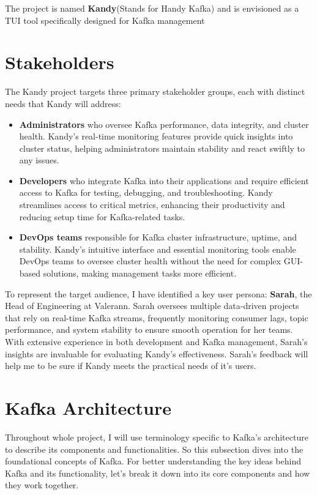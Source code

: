 \documentclass[10pt , a4paper]{report}
\begin{document}
The project is named \textbf{Kandy}(Stands for Handy Kafka) and is envisioned as a TUI tool specifically designed for Kafka management

\section{Stakeholders} 
The Kandy project targets three primary stakeholder groups, each with distinct needs that Kandy will address:

\begin{itemize} 
    \item \textbf{Administrators} who oversee Kafka performance, data integrity, and cluster health. Kandy’s real-time monitoring features provide quick insights into cluster status, helping administrators maintain stability and react swiftly to any issues.
    \item \textbf{Developers} who integrate Kafka into their applications and require efficient access to Kafka for testing, debugging, and troubleshooting. Kandy streamlines access to critical metrics, enhancing their productivity and reducing setup time for Kafka-related tasks.
    \item \textbf{DevOps teams} responsible for Kafka cluster infrastructure, uptime, and stability. Kandy’s intuitive interface and essential monitoring tools enable DevOps teams to oversee cluster health without the need for complex GUI-based solutions, making management tasks more efficient.
\end{itemize}

To represent the target audience, I have identified a key user persona: \textbf{Sarah}, the Head of Engineering at Valerann. Sarah oversees multiple data-driven projects that rely on real-time Kafka streams, frequently monitoring consumer lags, topic performance, and system stability to ensure smooth operation for her teams. With extensive experience in both development and Kafka management, Sarah’s insights are invaluable for evaluating Kandy’s effectiveness. Sarah’s feedback will help me to be sure if Kandy meets the practical needs of it's users.

\newpage

\section{Kafka Architecture}

Throughout whole project, I will use terminology specific to Kafka’s architecture to describe its components and functionalities. So
this subsection dives into the foundational concepts of Kafka. For better understanding the key ideas behind Kafka and its functionality, let’s break it down into its core components and how they work together.
\end{document}
